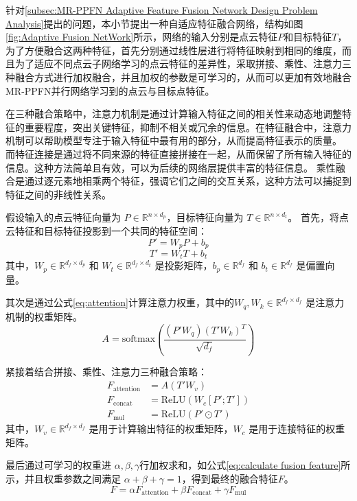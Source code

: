 针对\eqref{subsec:MR-PPFN Adaptive Feature Fusion Network Design Problem Analysis}提出的问题，本小节提出一种自适应特征融合网络，结构如图\eqref{fig:Adaptive Fusion NetWork}所示，网络的输入分别是点云特征$P$和目标特征$T$，为了方便融合这两种特征，首先分别通过线性层进行将特征映射到相同的维度，而且为了适应不同点云子网络学习的点云特征的差异性，采取拼接、乘性、注意力三种融合方式进行加权融合，并且加权的参数是可学习的，从而可以更加有效地融合MR-PPFN并行网络学习到的点云与目标点特征。 

在三种融合策略中，注意力机制是通过计算输入特征之间的相关性来动态地调整特征的重要程度，突出关键特征，抑制不相关或冗余的信息。在特征融合中，注意力机制可以帮助模型专注于输入特征中最有用的部分，从而提高特征表示的质量。
而特征连接是通过将不同来源的特征直接拼接在一起，从而保留了所有输入特征的信息。这种方法简单且有效，可以为后续的网络层提供丰富的特征信息。
乘性融合是通过逐元素地相乘两个特征，强调它们之间的交互关系，这种方法可以捕捉到特征之间的非线性关系。

假设输入的点云特征向量为 \( P \in \mathbb{R}^{n \times d_p} \)，目标特征向量为 \( T \in \mathbb{R}^{n \times d_t} \)。
首先，将点云特征和目标特征投影到一个共同的特征空间：
\begin{equation}
    P' = W_p P + b_p
\end{equation}
\begin{equation}
    T' = W_t T + b_t
\end{equation}
其中，\( W_p \in \mathbb{R}^{d_f \times d_p} \) 和 \( W_t \in \mathbb{R}^{d_f \times d_t} \) 是投影矩阵，\( b_p \in \mathbb{R}^{d_f} \) 和 \( b_t \in \mathbb{R}^{d_f} \) 是偏置向量。

其次是通过公式\eqref{eq:attention}计算注意力权重，其中的\( W_q, W_k \in \mathbb{R}^{d_f \times d_f} \) 是注意力机制的权重矩阵。
\begin{equation}
    \label{eq:attention}
    A = \text{softmax}\left(\frac{(P' W_q) (T' W_k)^T}{\sqrt{d_f}}\right)
\end{equation}

紧接着结合拼接、乘性、注意力三种融合策略：
\begin{align}
    F_{\text{attention}} &= A (T' W_v) \\
    F_{\text{concat}} &= \text{ReLU}(W_c [P'; T']) \\
    F_{\text{mul}} &= \text{ReLU}(P' \odot T')
\end{align}
其中，\( W_v \in \mathbb{R}^{d_f \times d_f} \) 是用于计算输出特征的权重矩阵，\( W_c \) 是用于连接特征的权重矩阵。

最后通过可学习的权重进 \(\alpha, \beta, \gamma\)行加权求和，如公式\eqref{eq:calculate fusion feature}所示，并且权重参数之间满足 \(\alpha + \beta + \gamma = 1\)，得到最终的融合特征$F$。
\begin{equation}
    \label{eq:calculate fusion feature}
    F = \alpha F_{\text{attention}} + \beta F_{\text{concat}} + \gamma F_{\text{mul}}
\end{equation}



